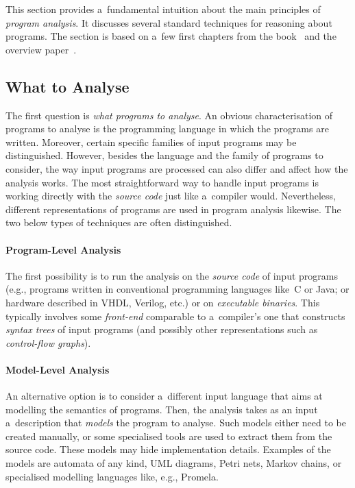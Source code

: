 This section provides a~fundamental intuition about the main principles of \emph{program analysis}. It discusses several standard techniques for reasoning about programs. The section is based on a~few first chapters from the book~\cite{staticAnalysisRival} and the overview paper~\cite{analysisAndVerVojnarKrena}.

\subsection{What to Analyse}

The first question is \emph{what programs to analyse}. An obvious characterisation of programs to analyse is the programming language in which the programs are written. Moreover, certain specific families of input programs may be distinguished. However, besides the language and the family of programs to consider, the way input programs are processed can also differ and affect how the analysis works. The most straightforward way to handle input programs is working directly with the \emph{source code} just like a~compiler would. Nevertheless, different representations of programs are used in program analysis likewise. The two below types of techniques are often distinguished.

\vspace{-1em}

\paragraph{Program-Level Analysis}
The first possibility is to run the analysis on the \emph{source code} of input programs (e.g., programs written in conventional programming languages like~C or Java; or hardware described in VHDL, Verilog, etc.) or on \emph{executable binaries}. This typically involves some \emph{front-end} comparable to a~compiler's one that constructs \emph{syntax trees} of input programs (and possibly other representations such as \emph{control-flow graphs}).

\paragraph{Model-Level Analysis}
An alternative option is to consider a~different input language that aims at modelling the semantics of programs. Then, the analysis takes as an input a~description that \emph{models} the program to analyse. Such models either need to be created manually, or some specialised tools are used to extract them from the source code. These models may hide implementation details. Examples of the models are automata of any kind, UML diagrams, Petri nets, Markov chains, or specialised modelling languages like, e.g., Promela.

